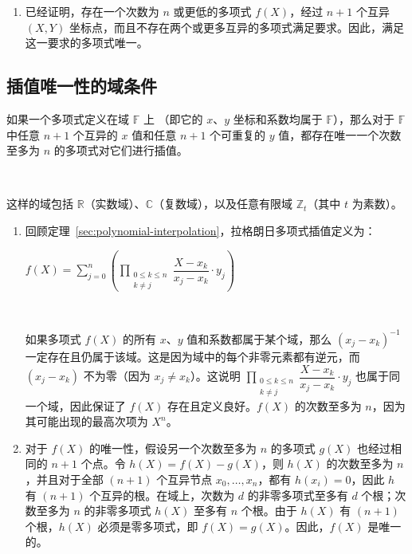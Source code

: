 \begin{myproof}
\begin{enumerate}
\item 已经证明，存在一个次数为 $n$ 或更低的多项式 $f(X)$，经过 $n+1$ 个互异 $(X, Y)$ 坐标点，而且不存在两个或更多互异的多项式满足要求。因此，满足这一要求的多项式唯一。

\end{enumerate}
\end{myproof}



\subsection{插值唯一性的域条件}
\label{subsec:polynomial-interpolation-field-condition}


\begin{tcolorbox}[title={\textbf{\tboxtheorem{\ref*{subsec:polynomial-interpolation-field-condition}} 插值唯一性的域条件}}]

如果一个多项式定义在域 $\mathbb{F}$ 上
（即它的 $x$、$y$
坐标和系数均属于 $\mathbb{F}$），那么对于 $\mathbb{F}$ 中任意 $n+1$ 个互异的 $x$ 值和任意 $n+1$ 个可重复的 $y$ 值，都存在唯一一个次数至多为 $n$ 的多项式对它们进行插值。

$ $

这样的域包括 $\mathbb{R}$（实数域）、$\mathbb{C}$（复数域），以及任意有限域 $\mathbb{Z}_t$（其中 $t$ 为素数）。

\end{tcolorbox}


\begin{myproof}
\begin{enumerate}

\item 回顾定理~\ref*{sec:polynomial-interpolation}，拉格朗日多项式插值定义为：

$f(X) = \sum\limits_{j=0}^{n} \left( \prod\limits_{\substack{0 \le k \le n\\ k \ne j}} \dfrac{X - x_k}{x_j - x_k} \cdot y_j\right)$

$ $

如果多项式 $f(X)$ 的所有 $x$、$y$ 值和系数都属于某个域，那么 $(x_j - x_k)^{-1}$ 一定存在且仍属于该域。这是因为域中的每个非零元素都有逆元，而 $(x_j - x_k)$ 不为零（因为 $x_j \neq x_k$）。这说明 $\prod\limits_{\substack{0 \le k \le n\\ k \ne j}} \dfrac{X - x_k}{x_j - x_k} \cdot y_j$ 也属于同一个域，因此保证了 $f(X)$ 存在且定义良好。$f(X)$ 的次数至多为 $n$，因为其可能出现的最高次项为 $X^{n}$。

\item 对于 $f(X)$ 的唯一性，假设另一个次数至多为 $n$ 的多项式 $g(X)$ 也经过相同的 $n+1$ 个点。令 $h(X) = f(X) - g(X)$，则 $h(X)$ 的次数至多为 $n$，并且对于全部 $(n+1)$ 个互异节点 $x_0,\dots,x_{n}$，都有 $h(x_i) = 0$，因此 $h$ 有 $(n+1)$ 个互异的根。在域上，次数为 $d$ 的非零多项式至多有 $d$ 个根；次数至多为 $n$ 的非零多项式 $h(X)$ 至多有 $n$ 个根。由于 $h(X)$ 有 $(n+1)$ 个根，$h(X)$ 必须是零多项式，即 $f(X) = g(X)$。因此，$f(X)$ 是唯一的。


\end{enumerate}
\end{myproof}